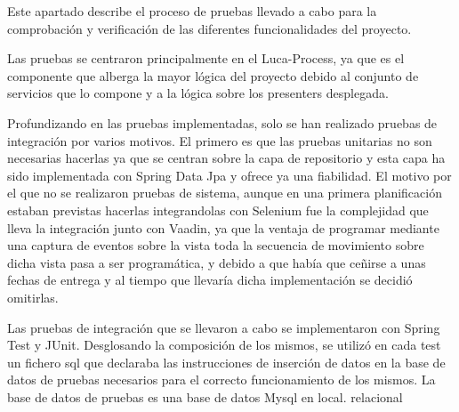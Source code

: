 	Este apartado describe el proceso de pruebas llevado a cabo para la comprobación y verificación de las diferentes funcionalidades del proyecto.
	
	\vspace{5mm}
	
	Las pruebas se centraron principalmente en el Luca-Process, ya que es el componente que alberga la mayor lógica del proyecto debido al conjunto de servicios que lo compone y a la lógica sobre los presenters desplegada.
	
	\vspace{5mm}
	
	Profundizando en las pruebas implementadas, solo se han realizado pruebas de integración por varios motivos. El primero es que las pruebas unitarias no son necesarias hacerlas ya que se centran sobre la capa de repositorio y esta capa ha sido implementada con Spring Data Jpa\cite{jpa} y ofrece ya una fiabilidad. El motivo por el que no se realizaron pruebas de sistema, aunque en una primera planificación estaban previstas hacerlas integrandolas con Selenium\cite{selenium} fue la complejidad que lleva la integración junto con Vaadin\cite{vaadin}, ya que la ventaja de programar mediante una captura de eventos sobre la vista toda la secuencia de movimiento sobre dicha vista pasa a ser programática, y debido a que había que ceñirse a unas fechas de entrega y al tiempo que llevaría dicha implementación se decidió omitirlas.
	
	\vspace{5mm}
	
	Las pruebas de integración que se llevaron a cabo se implementaron con Spring Test\cite{springTest} y JUnit\cite{junit}. Desglosando la composición de los mismos, se utilizó en cada test un fichero sql que declaraba las instrucciones de inserción de datos en la base de datos de pruebas necesarios para el correcto funcionamiento de los mismos. La base de datos de pruebas es una base de datos Mysql en local. relacional





	 